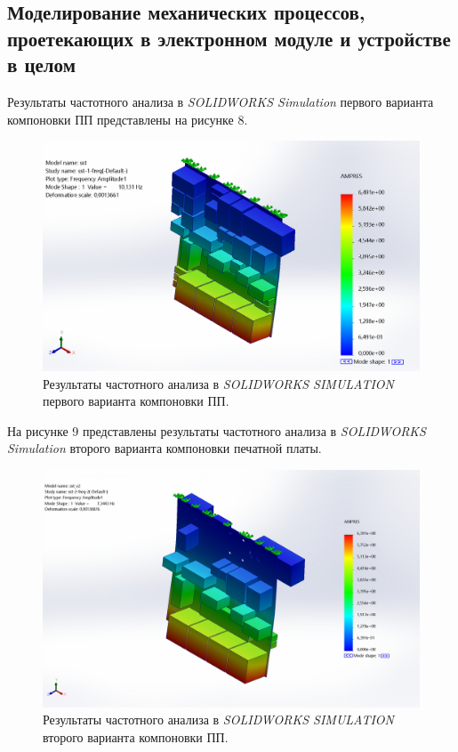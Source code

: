 \subsection{Моделирование механических процессов, проетекающих в электронном модуле и устройстве в целом}

Результаты частотного анализа в \textit{SOLIDWORKS Simulation} первого варианта компоновки ПП представлены на рисунке 8.

\begin{figure}[h]
  \centering
  \includegraphics[scale=0.3]{../img/sst-1/freq/top_view/sst-sst-1-freq-Amplitude-Amplitude1.jpg}
  \caption{Результаты частотного анализа в \textit{SOLIDWORKS SIMULATION} первого варианта компоновки ПП.}
\end{figure}


На рисунке 9 представлены результаты частотного анализа в \textit{SOLIDWORKS Simulation} второго варианта компоновки печатной платы.

\begin{figure}[h]
  \centering
  \includegraphics[scale = 0.3]{../img/sst-2/freq/sst_v2-sst-2-freq-2-Amplitude-Amplitude1.jpg}
  \caption{Результаты частотного анализа в \textit{SOLIDWORKS SIMULATION} второго варианта компоновки ПП.}

\end{figure}

